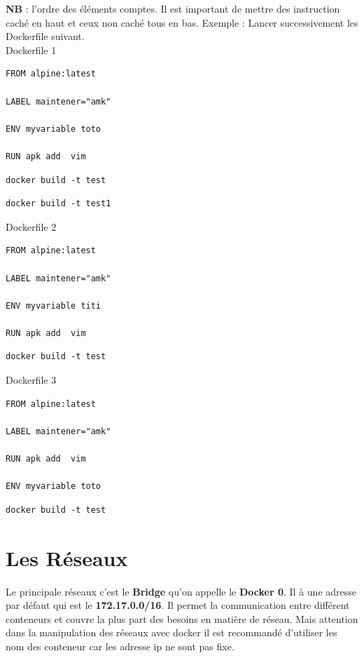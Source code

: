 \documentclass[12pt,a4paper]{article}
\begin{document}
\textbf{NB } : l'ordre des éléments comptes. Il est important de mettre des instruction
caché en haut et ceux non caché tous en bas.
Exemple : Lancer successivement les Dockerfile suivant.\\
Dockerfile 1
\begin{verbatim}
FROM alpine:latest

LABEL maintener="amk"

ENV myvariable toto

RUN apk add  vim
\end{verbatim} 
\begin{verbatim}
docker build -t test
\end{verbatim}
\begin{verbatim}
docker build -t test1
\end{verbatim}
Dockerfile 2
\begin{verbatim}
FROM alpine:latest

LABEL maintener="amk"

ENV myvariable titi

RUN apk add  vim
\end{verbatim} 
\begin{verbatim}
docker build -t test
\end{verbatim}
Dockerfile 3
\begin{verbatim}
FROM alpine:latest

LABEL maintener="amk"

RUN apk add  vim

ENV myvariable toto
\end{verbatim} 
\begin{verbatim}
docker build -t test
\end{verbatim}

\section{Les Réseaux}
Le principale réseaux c'est le \textbf{Bridge} qu'on appelle le \textbf{Docker 0}.
Il à une adresse par défaut qui est le
\textbf{172.17.0.0/16}. Il permet la communication entre différent conteneurs et couvre 
la plus part des besoins en matière de réseau. Mais attention dans la manipulation des 
réseaux avec docker il est recommandé d'utiliser les nom des conteneur car les adresse 
ip ne sont pas fixe.
\end{document}
